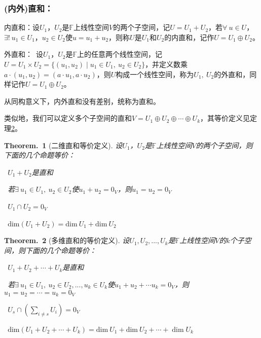 \documentclass[zihao=5,UTF8]{report}
\theoremstyle{mystyle} %
\newtheorem{theorem}{Theorem.\,}
\begin{document}
\subsubsection{(内外)直和：}
内直和：设$U_1$，$U_2$是$\mathbb{F}$上线性空间$V$的两个子空间，记$U = U_1+U_2$，若$\forall\  u \in U$，$\exists !\  u_1\in U_1$，$u_2 \in U_2$使$u = u_1 +u_2$，则称$U$是$U_1$和$U_2$的内直和，记作$U =U_1 \oplus U_2$。\par 
外直和：\ 设$U_1$，$U_2$是$\mathbb{F}$上的任意两个线性空间，记$U = U_1\times U_2 = \{(u_1,u_2)\mid u_1\in U_1,\ u_2\in U_2\}$，并定义数乘$a\cdot(u_1,u_2) = (a\cdot u_1,a\cdot u_2)$，则$U$构成一个线性空间，称为$U_1,\ U_2$的外直和，同样记作$U = U_1\oplus U_2$。\par
从同构意义下，内外直和没有差别，统称为直和。\par
类似地，我们可以定义多个子空间的直和$V = U_1 \oplus U_2 \oplus \cdots \oplus U_k$，其等价定义见定理\ref{多维直和的等价定义}。

\begin{theorem}[二维直和等价定义]
    设$U_1$，$U_2$是$\mathbb{F}$上线性空间$V$的两个子空间，则下面的几个命题等价：\par
    \ $U_1+U_2$是直和
    \par
    \ 若$\exists\  u_1\in U_1,\ u_2 \in U_2$使$ u_1 +u_2=0_{V}$，则$u_1=u_2=0_{V}$
    \par
    \ $U_1\cap U_2=0_{V}$
    \par
    \ $\text{dim}(U_1+U_2)= \text{dim}\ U_1 + \text{dim}\ U_2 $ 
    \par
\end{theorem}
\begin{theorem}[多维直和的等价定义]\label{多维直和的等价定义}
    设$U_1 ,U_2 , ..., U_k$是$\mathbb{F}$上线性空间$V$的$k$个子空间，则下面的几个命题等价：\par
    \ $U_1+U_2+\cdots + U_k$是直和
    \par
    \ 若$\exists\  u_1\in U_1,\ u_2 \in U_2,...,u_k \in U_k$使$ u_1 +u_2+ \cdots u_k= 0_{V}$，则$u_1=u_2=\cdots =u_k=0_{V}$
    \par
    \ $ U_s\cap (\underset{i\ne s}{\sum}U_i)  =0_{V}$
    \par
    \ $\text{dim}(U_1+U_2+\cdots + U_k)= \text{dim}\ U_1 + \text{dim}\ U_2 +\cdots + \dim U_k$ 
    \par
\end{theorem}
\end{document}
